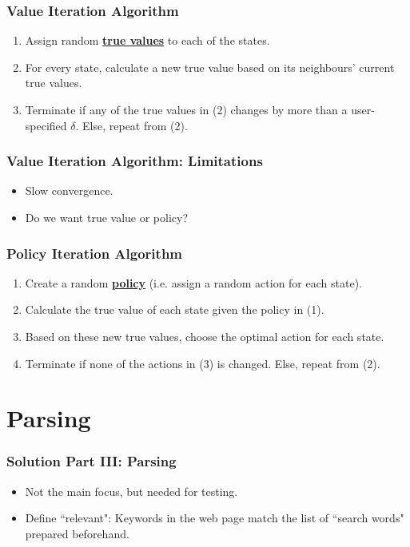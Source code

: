 \documentclass{beamer}
\begin{document}
\begin{frame}
\frametitle{Value Iteration Algorithm}
\begin{enumerate}
\item Assign random \textbf{\underline{true values}} to each of the states.
\item For every state, calculate a new true value based on its neighbours' current true values.
\item Terminate if any of the true values in (2) changes by more than a user-specified $ \delta $. Else, repeat from (2).
\end{enumerate}
\end{frame}

\begin{frame}
\frametitle{Value Iteration Algorithm: Limitations}
\begin{itemize}
\item Slow convergence.
\item Do we want true value or policy?
\end{itemize}
\end{frame}

\begin{frame}
\frametitle{Policy Iteration Algorithm}
\begin{enumerate}
\item Create a random \textbf{\underline{policy}} (i.e. assign a random action for each state).
\item Calculate the true value of each state given the policy in (1).
\item Based on these new true values, choose the optimal action for each state.
\item Terminate if none of the actions in (3) is changed. Else, repeat from (2).
\end{enumerate}
\end{frame}

\section{Parsing}
\begin{frame}
\frametitle{Solution Part III: Parsing}
\begin{itemize}
\item Not the main focus, but needed for testing.
\item Define ``relevant": Keywords in the web page match the list of ``search words" prepared beforehand.
\end{itemize}
\end{frame}
\end{document}
